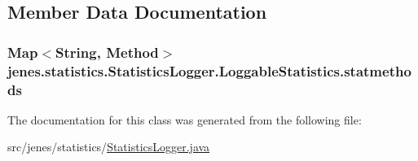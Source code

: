 \subsection{Member Data Documentation}
\hypertarget{classjenes_1_1statistics_1_1_statistics_logger_1_1_loggable_statistics_a4c3dcfc80b9300adc8ed0942ae912f8d}{
\subsubsection[{statmethods}]{\setlength{\rightskip}{0pt plus 5cm}Map$<$String, Method$>$ jenes.\-statistics.\-Statistics\-Logger.\-Loggable\-Statistics.\-statmethods\hspace{0.3cm}{\ttfamily [private]}}}\label{classjenes_1_1statistics_1_1_statistics_logger_1_1_loggable_statistics_a4c3dcfc80b9300adc8ed0942ae912f8d}


The documentation for this class was generated from the following file\-:\begin{DoxyCompactItemize}
\item 
src/jenes/statistics/\hyperlink{_statistics_logger_8java}{Statistics\-Logger.\-java}\end{DoxyCompactItemize}
